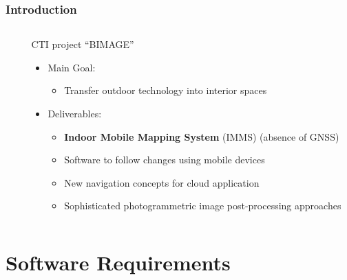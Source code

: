 \documentclass[aspectratio=169]{beamer}
\begin{document}
  \begin{frame}
   \frametitle{Introduction}
   \begin{columns}[onlytextwidth]
    \begin{column}{0.5\textwidth}
    
    
    \end{column}
    \begin{column}{0.5\textwidth}
    CTI project ``BIMAGE''
      \begin{itemize}
       \item Main Goal: 
       \begin{itemize}\item Transfer outdoor technology into interior spaces\end{itemize}
       \pause
       \item Deliverables:
       \begin{itemize}
        \item \textbf{Indoor Mobile Mapping System} (IMMS) (absence of GNSS) \pause
        \item Software to follow changes using mobile devices \pause
        \item New navigation concepts for cloud application \pause
        \item Sophisticated photogrammetric image post-processing approaches 
       \end{itemize}
      \end{itemize}
    \end{column}
   \end{columns}
  \end{frame}


\section{Software Requirements}
\end{document}
